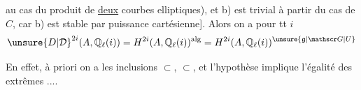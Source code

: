 au cas du produit de \uline{deux} courbes
elliptiques), et b) est trivial à partir du
cas de $C$, car b) est stable par 
puissance cartésienne]. Alors on a pour tt $i$
\[
\unsure{D|\mathcal D}^{2i}(A,\mathbb Q_\ell(i))=H^{2i}(A,\mathbb Q_\ell(i))^{\mathrm{alg}}=H^{2i}(A,\mathbb Q_\ell(i))^{\unsure{\mathfrak g|\mathscr G|U}}
\]

En effet,  à priori on a les
inclusions $\subset$, $\subset$, et l'hypothèse implique
l'égalité des extrêmes ....

